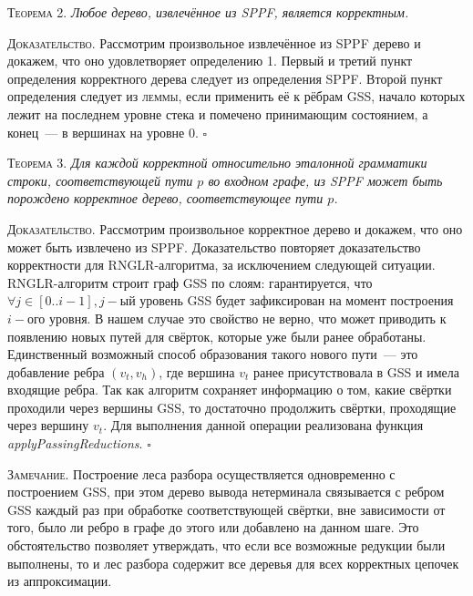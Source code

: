 \textsc{Теорема 2.} 
\textit{Любое дерево, извлечённое из SPPF, является корректным.}

\textsc{Доказательство.}
Рассмотрим произвольное извлечённое из SPPF дерево и докажем, что оно удовлетворяет определению 1. Первый и третий пункт определения корректного дерева следует из определения SPPF. Второй пункт определения следует из \textsc{леммы}, если применить её к рёбрам GSS, начало которых лежит на последнем уровне стека и помечено принимающим состоянием, а конец~--- в вершинах на уровне 0. $\square$

\textsc{Теорема 3.} 
\textit{Для каждой корректной относительно эталонной грамматики строки, соответствующей пути $p$ во входном графе, из SPPF может быть порождено корректное дерево, соответствующее пути $p$.}

\textsc{Доказательство.}
Рассмотрим произвольное корректное дерево и докажем, что оно может быть извлечено из SPPF. Доказательство повторяет доказательство корректности для RNGLR-алгоритма, за исключением следующей ситуации. RNGLR-алгоритм строит граф GSS по слоям: гарантируется, что $\forall j \in [0..i-1], j-$ый уровень GSS будет зафиксирован на момент построения $i-$ого уровня. В нашем случае это свойство не верно, что может приводить к появлению новых путей для свёрток, которые уже были ранее обработаны. Единственный возможный способ образования такого нового пути~--- это добавление ребра $(v_{t}, v_{h})$, где вершина $v_{t}$ ранее присутствовала в GSS и имела входящие ребра. Так как алгоритм сохраняет информацию о том, какие свёртки проходили через вершины GSS, то достаточно продолжить свёртки, проходящие через вершину $v_{t}$. Для выполнения данной операции реализована функция 
\emph{applyPassingReductions}. $\square$

\textsc{Замечание.} Построение леса разбора осуществляется одновременно с построением GSS, при этом дерево вывода нетерминала связывается с ребром GSS каждый раз при обработке соответствующей свёртки, вне зависимости от того, было ли ребро в графе до этого или добавлено на данном шаге. Это обстоятельство позволяет утверждать, что если все возможные редукции были выполнены, то и лес разбора содержит все деревья для всех корректных цепочек из аппроксимации.
